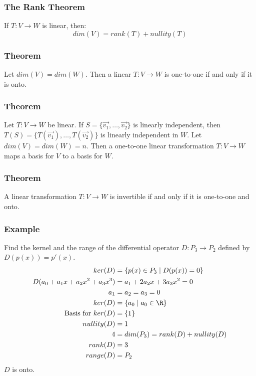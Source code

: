 \documentclass{math}
\begin{document}
\subsubsection*{The Rank Theorem}
If \( T:V\to W \) is linear, then:
\[ dim(V) = rank(T)+nullity(T) \]

\subsubsection*{Theorem}
Let \( dim(V) = dim(W) \). Then a linear \( T:V\to W \) is one-to-one if and
only if it is onto.

\subsubsection*{Theorem}
Let \( T:V\to W \) be linear. If \( S = \{\vec{v_1},\dots,\vec{v_2} \} \) is
linearly independent, then \( T(S) = \{T(\vec{v_1}),\dots,T(\vec{v_2})\} \) is
linearly independent in \( W \). Let \( dim(V) = dim(W) = n \). Then a
one-to-one linear transformation \( T:V\to W \) maps a basis for \( V \) to a
basis for \( W \).

\subsubsection*{Theorem}
A linear transformation \( T:V\to W \) is invertible if and only if it is
one-to-one and onto.

\subsubsection*{Example}
Find the kernel and the range of the differential operator \( D:P_3\to P_2 \)
defined by \( D(p(x)) = p'(x) \).
\begin{align*}
  ker(D) &= \{p(x)\in P_3\mid D(p(x)) = 0\} \\
  D(a_0+a_1x+a_2x^2+a_3x^3) &= a_1+2a_2x+3a_3x^2 = 0 \\
  a_1 &= a_2 = a_3 = 0 \\
  ker(D) &= \{a_0\mid a_0\in\R \} \\
  \text{Basis for } ker(D) &= \{1\} \\
  nullity(D) &= 1 \\
  4 &= dim(P_3) = rank(D)+nullity(D) \\
  rank(D) &= 3 \\
  range(D) &= P_2
\end{align*}
\( D \) is onto.
\end{document}
